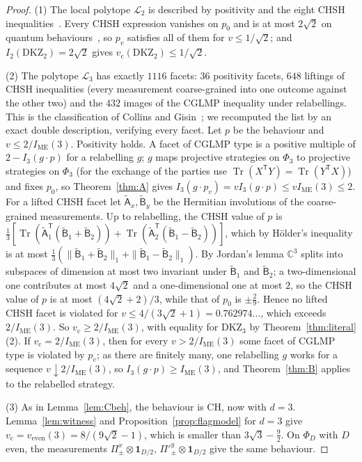 \documentclass[11pt]{amsart}
\theoremstyle{definition}
\theoremstyle{remark}
\numberwithin{equation}{section}
\newcommand{\C}{\mathbb{C}}
\newcommand{\Tr}{\operatorname{Tr}}
\newcommand{\IME}{I_{\mathrm{ME}}}
\newcommand{\one}{\mathbf{1}}
\newcommand{\cL}{\mathcal{L}}
\newcommand{\vc}{v_{\mathrm c}}
\newcommand{\veven}{v_{\mathrm{even}}}
\newcommand{\CH}{\mathrm{CH}}
\newcommand{\DKZ}{\mathrm{DKZ}}
\begin{document}
\begin{proof}
(1) The local polytope $\cL_2$ is described by positivity and the eight CHSH inequalities~\cite{Fine}. Every CHSH
expression vanishes on $p_0$ and is at most $2\sqrt2$ on quantum behaviours~\cite{Tsirelson}, so $p_v$ satisfies all
of them for $v\le1/\sqrt2$; and $I_2(\DKZ_2)=2\sqrt2$ gives $\vc(\DKZ_2)\le1/\sqrt2$.

(2) The polytope $\cL_3$ has exactly $1116$ facets: $36$ positivity facets, $648$ liftings of CHSH inequalities (every
measurement coarse-grained into one outcome against the other two) and the $432$ images of the CGLMP inequality under
relabellings. This is the classification of Collins and Gisin~\cite{CollinsGisin}; we recomputed the list by an exact
double description, verifying every facet. Let $p$ be the behaviour and $v\le2/\IME(3)$. Positivity holds. A facet of
CGLMP type is a positive multiple of $2-I_3(g\cdot p)$ for a relabelling $g$; $g$ maps projective strategies on $\Phi_3$
to projective strategies on $\Phi_3$ (for the exchange of the parties use $\Tr(X^{\mathsf T}Y)=\Tr(Y^{\mathsf T}X)$) and
fixes $p_0$, so Theorem~\ref{thm:A} gives $I_3(g\cdot p_v)=vI_3(g\cdot p)\le v\IME(3)\le2$. For a lifted CHSH facet let
$\tilde{\mathsf A}_x,\tilde{\mathsf B}_y$ be the Hermitian involutions of the coarse-grained measurements. Up to
relabelling, the CHSH value of $p$ is
$\frac13[\Tr(\tilde{\mathsf A}_1^{\mathsf T}(\tilde{\mathsf B}_1+\tilde{\mathsf B}_2))+\Tr(\tilde{\mathsf A}_2^{\mathsf T}(\tilde{\mathsf B}_1-\tilde{\mathsf B}_2))]$,
which by H\"older's inequality is at most
$\frac13(\|\tilde{\mathsf B}_1+\tilde{\mathsf B}_2\|_1+\|\tilde{\mathsf B}_1-\tilde{\mathsf B}_2\|_1)$. By Jordan's
lemma $\C^3$ splits into subspaces of dimension at most two invariant under $\tilde{\mathsf B}_1$ and
$\tilde{\mathsf B}_2$; a two-dimensional one contributes at most $4\sqrt2$ and a one-dimensional one at most $2$, so the
CHSH value of $p$ is at most $(4\sqrt2+2)/3$, while that of $p_0$ is $\pm\frac29$. Hence no lifted CHSH facet is
violated for $v\le4/(3\sqrt2+1)=0.762974\ldots$, which exceeds $2/\IME(3)$. So $\vc\ge2/\IME(3)$, with equality for
$\DKZ_3$ by Theorem~\ref{thm:literal}(2). If $\vc=2/\IME(3)$, then for every $v>2/\IME(3)$ some facet of CGLMP type is
violated by $p_v$; as there are finitely many, one relabelling $g$ works for a sequence $v\downarrow2/\IME(3)$, so
$I_3(g\cdot p)\ge\IME(3)$, and Theorem~\ref{thm:B} applies to the relabelled strategy.

(3) As in Lemma~\ref{lem:Cbeh}, the behaviour is $\CH$, now with $d=3$. Lemma~\ref{lem:witness} and
Proposition~\ref{prop:flagmodel} for $d=3$ give $\vc=\veven(3)=8/(9\sqrt2-1)$, which is smaller than $3\sqrt3-\frac92$.
On $\Phi_D$ with $D$ even, the measurements $\Pi^x_\pm\otimes\one_{D/2}$, $\Pi'^y_\pm\otimes\one_{D/2}$ give the same
behaviour.
\end{proof}
\end{document}
